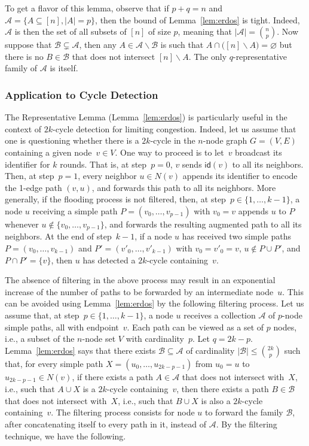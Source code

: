 \documentclass{article}
\newcommand{\id}{\mathsf{id}}
\begin{document}
To get a flavor of this lemma, observe that if $p+q= n$ and $\mathcal{A}=\{A\subseteq [n], |A|=p\}$, then the bound of Lemma~\ref{lem:erdos} is tight. Indeed, $\mathcal{A}$ is then the set of all subsets of $[n]$ of size $p$, meaning that $|\mathcal{A}|=\binom{n}{p}$. Now suppose that $\mathcal{B}\subsetneq\mathcal{A}$, then any $A\in\mathcal{A}\smallsetminus\mathcal{B}$ is such that $A\cap\big([n]\smallsetminus A\big)=\varnothing$ but there is no $B\in\mathcal{B}$ that does not intersect $[n]\smallsetminus A$. The only $q$-representative family of $\mathcal{A}$ is itself.

\subsubsection{Application to Cycle Detection} 
\label{subsubsec:application-filtering}

The Representative Lemma (Lemma~\ref{lem:erdos}) is particularly useful in the context of $2k$-cycle detection for limiting congestion. Indeed, let us assume that one is questioning whether there is a $2k$-cycle in the $n$-node graph $G=(V,E)$ containing a given node~$v\in V$. One way to proceed is to let~$v$ broadcast its identifier for $k$ rounds. That is, at step~$p=0$, $v$ sends $\id(v)$ to all its neighbors. Then, at step~$p=1$, every neighbor $u\in N(v)$ appends its identifier to encode the 1-edge path $(v,u)$, and forwards this path to all its neighbors. More generally, if the flooding process is not filtered, then, at step~$p\in\{1,\dots,k-1\}$, a node $u$ receiving a simple path $P=(v_0,\dots,v_{p-1})$ with $v_0=v$ appends $u$ to $P$ whenever $u\notin \{v_0,\dots,v_{p-1}\}$, and forwards the resulting augmented path to all its neighbors. At the end of step~$k-1$, if a node $u$ has received two simple paths $P=(v_0,\dots,v_{k-1})$ and $P'=(v'_0,\dots,v'_{k-1})$ with $v_0=v'_0=v$, $u\notin P\cup P'$, and $P\cap P'=\{v\}$, then $u$ has detected a $2k$-cycle containing~$v$. 

The absence  of filtering in the above process may result in an exponential increase of the number of paths to be forwarded by an intermediate node~$u$. This can be avoided using Lemma~\ref{lem:erdos} by the following filtering process. Let us assume that, at step~$p\in\{1,\dots,k-1\}$, a node $u$ receives a collection $\mathcal{A}$ of $p$-node simple paths, all with endpoint~$v$. Each path can be viewed as a set of $p$ nodes, i.e., a subset of the $n$-node set $V$ with cardinality~$p$. 
Let $q=2k-p$. Lemma~\ref{lem:erdos} says that there exists $\mathcal{B}\subseteq \mathcal{A}$ of cardinality $|\mathcal{B}|\leq \binom{2k}{p}$ such that, for every simple path 
$X=(u_0,\dots,u_{2k-p-1})$ from $u_0=u$ to $u_{2k-p-1}\in N(v)$, if there exists a path $A\in \mathcal{A}$ that does not intersect with~$X$, i.e., such that $A\cup X$ is a $2k$-cycle containing~$v$, then there exists a path $B\in \mathcal{B}$ that does not intersect with~$X$, i.e., such that $B\cup X$ is also a $2k$-cycle containing~$v$. The filtering process consists for node $u$ to forward the family $\mathcal{B}$, after concatenating itself to every path in it, instead of $\mathcal{A}$. By the filtering technique, we have the following. 
\end{document}

